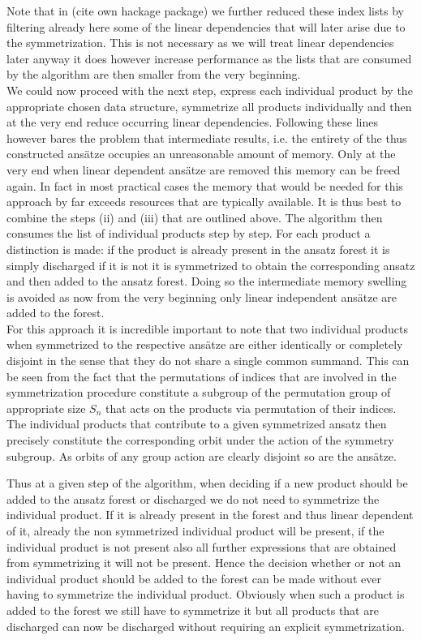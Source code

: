 \documentclass[a4paper,12pt, DIV=14, BCOR=5mm, twoside, headsepline, numbers=noenddot]{scrbook}
\begin{document}
Note that in (cite own hackage package) we further reduced these index lists by filtering already here some of the linear dependencies that will later arise due to the symmetrization. This is not necessary as we will treat linear dependencies later anyway it does however increase performance as the lists that are consumed by the algorithm are then smaller from the very beginning.  \\

We could now proceed with the next step, express each individual product by the appropriate chosen data structure, symmetrize all products individually and then at the very end reduce occurring linear dependencies. Following these lines however bares the problem that intermediate results, i.e. the entirety of the thus constructed ansätze occupies an unreasonable amount of memory. Only at the very end when linear dependent ansätze are removed this memory can be freed again. In fact in most practical cases the memory that would be needed for this approach by far exceeds resources that are typically available.
It is thus best to combine the steps (ii) and (iii) that are outlined above. The algorithm then consumes the list of individual products step by step. For each product a distinction is made: if the product is already present in the ansatz forest it is simply discharged if it is not it is symmetrized to obtain the corresponding ansatz and then added to the ansatz forest. Doing so the intermediate memory swelling is avoided as now from the very beginning only linear independent ansätze are added to the forest.\\

For this approach it is incredible important to note that two individual products when symmetrized to the respective ansätze are either identically or completely disjoint in the sense that they do not share a single common summand. This can be seen from the fact that the permutations of indices that are involved in the symmetrization procedure constitute a subgroup of the permutation group of appropriate size $S_n$ that acts on the products via permutation of their indices. The individual products that contribute to a given symmetrized ansatz then precisely constitute the corresponding orbit under the action of the symmetry subgroup. As orbits of any group action are clearly disjoint so are the ansätze. 

Thus at a given step of the algorithm, when deciding if a new product should be added to the ansatz forest or discharged we do not need to symmetrize the individual product. If it is already present in the forest and thus linear dependent of it, already the non symmetrized individual product will be present, if the individual product is not present also all further expressions that are obtained from symmetrizing it will not be present. Hence the decision whether or not an individual product should be added to the forest can be made without ever having to symmetrize the individual product. Obviously when such a product is added to the forest we still have to symmetrize it but all products that are discharged can now be discharged without requiring an explicit symmetrization.\\ 
\end{document}
